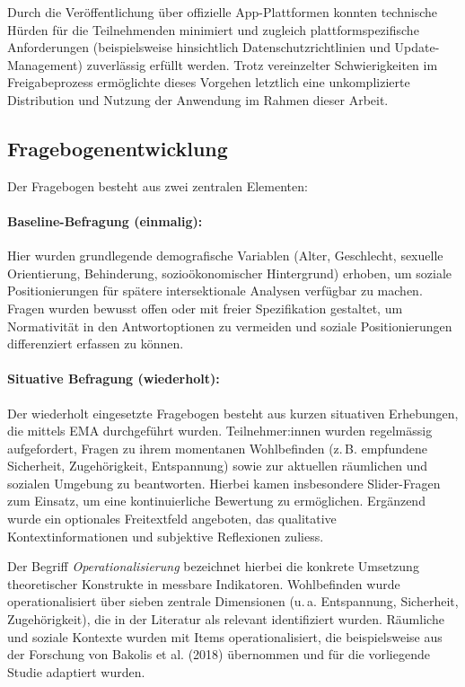 Durch die Veröffentlichung über offizielle App-Plattformen konnten technische Hürden für die Teilnehmenden minimiert und zugleich plattformspezifische Anforderungen (beispielsweise hinsichtlich Datenschutzrichtlinien und Update-Management) zuverlässig erfüllt werden. Trotz vereinzelter Schwierigkeiten im Freigabeprozess ermöglichte dieses Vorgehen letztlich eine unkomplizierte Distribution und Nutzung der Anwendung im Rahmen dieser Arbeit.

\subsection{Fragebogenentwicklung}\label{sec:fragebogen}

Der Fragebogen besteht aus zwei zentralen Elementen:

\paragraph{Baseline-Befragung (einmalig):}
Hier wurden grundlegende demografische Variablen (Alter, Geschlecht, sexuelle Orientierung, Behinderung, sozioökonomischer Hintergrund) erhoben, um soziale Positionierungen für spätere intersektionale Analysen verfügbar zu machen. Fragen wurden bewusst offen oder mit freier Spezifikation gestaltet, um Normativität in den Antwortoptionen zu vermeiden und soziale Positionierungen differenziert erfassen zu können.

\paragraph{Situative Befragung (wiederholt):}
Der wiederholt eingesetzte Fragebogen besteht aus kurzen situativen Erhebungen, die mittels EMA durchgeführt wurden. Teilnehmer:innen wurden regelmässig aufgefordert, Fragen zu ihrem momentanen Wohlbefinden (z.\,B. empfundene Sicherheit, Zugehörigkeit, Entspannung) sowie zur aktuellen räumlichen und sozialen Umgebung zu beantworten. Hierbei kamen insbesondere Slider-Fragen zum Einsatz, um eine kontinuierliche Bewertung zu ermöglichen. Ergänzend wurde ein optionales Freitextfeld angeboten, das qualitative Kontextinformationen und subjektive Reflexionen zuliess.

Der Begriff \emph{Operationalisierung} bezeichnet hierbei die konkrete Umsetzung theoretischer Konstrukte in messbare Indikatoren. Wohlbefinden wurde operationalisiert über sieben zentrale Dimensionen (u.\,a. Entspannung, Sicherheit, Zugehörigkeit), die in der Literatur als relevant identifiziert wurden. Räumliche und soziale Kontexte wurden mit Items operationalisiert, die beispielsweise aus der Forschung von Bakolis et al. (2018) übernommen und für die vorliegende Studie adaptiert wurden.

